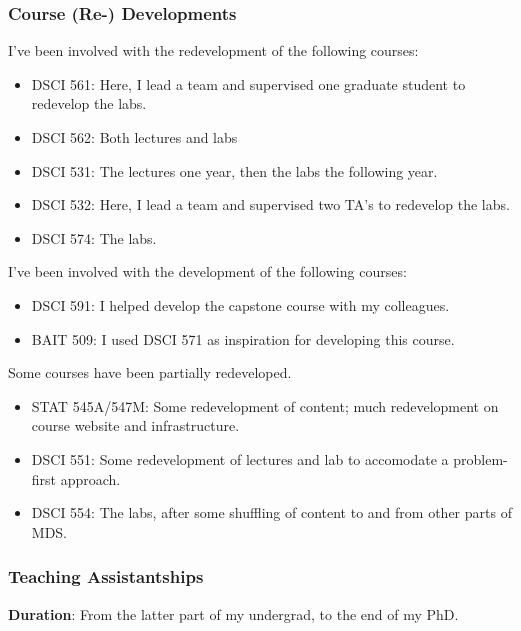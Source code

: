 \documentclass[]{article}
\providecommand{\tightlist}{%
  \setlength{\itemsep}{0pt}\setlength{\parskip}{0pt}}
\begin{document}
\hypertarget{course-re--developments}{%
\subsubsection{Course (Re-) Developments}\label{course-re--developments}}

I've been involved with the redevelopment of the following courses:

\begin{itemize}
\tightlist
\item
  DSCI 561: Here, I lead a team and supervised one graduate student to redevelop the labs.
\item
  DSCI 562: Both lectures and labs
\item
  DSCI 531: The lectures one year, then the labs the following year.
\item
  DSCI 532: Here, I lead a team and supervised two TA's to redevelop the labs.
\item
  DSCI 574: The labs.
\end{itemize}

I've been involved with the development of the following courses:

\begin{itemize}
\tightlist
\item
  DSCI 591: I helped develop the capstone course with my colleagues.
\item
  BAIT 509: I used DSCI 571 as inspiration for developing this course.
\end{itemize}

Some courses have been partially redeveloped.

\begin{itemize}
\tightlist
\item
  STAT 545A/547M: Some redevelopment of content; much redevelopment on course website and infrastructure.
\item
  DSCI 551: Some redevelopment of lectures and lab to accomodate a problem-first approach.
\item
  DSCI 554: The labs, after some shuffling of content to and from other parts of MDS.
\end{itemize}

\hypertarget{teaching-assistantships}{%
\subsubsection{Teaching Assistantships}\label{teaching-assistantships}}

\textbf{Duration}: From the latter part of my undergrad, to the end of my PhD.
\end{document}
